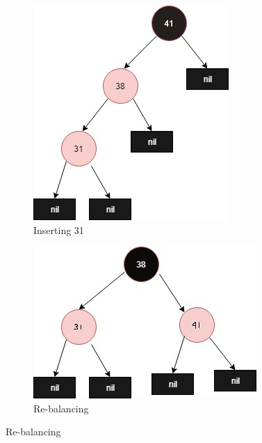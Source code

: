\documentclass[20pt]{article} %
\begin{document}
\begin{figure}[!htbp]
  	\centering
   	\begin{subfigure}[p]{0.4\linewidth}
    	\includegraphics[width=\linewidth]{3-1.jpg}
     	\caption{Inserting 31}
   	\end{subfigure}
  	\begin{subfigure}[p]{0.4\linewidth}
    	\includegraphics[width=\linewidth]{3-2.jpg}
    	\caption{Re-balancing}
  	\end{subfigure}


\end{figure}
\end{document}
